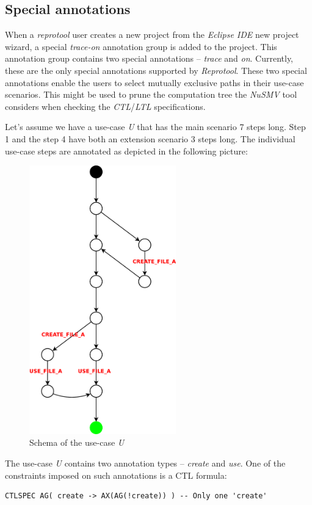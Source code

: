 \subsection{Special annotations}

When a \emph{reprotool} user creates a new project from the \emph{Eclipse IDE} new project wizard, a special \emph{trace-on} annotation group is added to the project.
This annotation group contains two special annotations -- \emph{trace} and \emph{on}.
Currently, these are the only special annotations supported by \emph{Reprotool}.
These two special annotations enable the users to select mutually exclusive paths in their use-case scenarios.
This might be used to prune the computation tree the \emph{NuSMV} tool considers when checking the \emph{CTL}/\emph{LTL} specifications.

Let's assume we have a use-case \emph{U} that has the main scenario 7 steps long.
Step 1 and the step 4 have both an extension scenario 3
steps long.
The individual use-case steps are annotated as depicted in the following picture:


\begin{figure}[ht]
  \centering
  \includegraphics[width=180pt]{images/traceTest_no_trace}
  \caption{Schema of the use-case \emph{U}}
  \label{fig:traceTest_no_trace}
\end{figure}


The use-case \emph{U} contains two annotation types -- \emph{create} and \emph{use}.
One of the constraints imposed on such annotations is a CTL formula:
\begin{verbatim}
CTLSPEC AG( create -> AX(AG(!create)) ) -- Only one 'create'
\end{verbatim}

